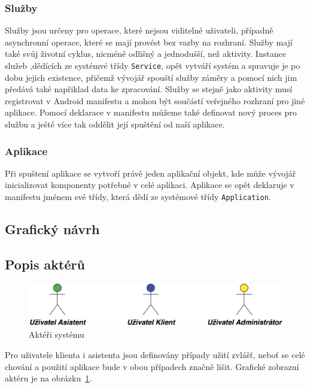 \documentclass{article}
\begin{document}
\subsubsection{Služby}
Služby jsou určeny pro operace, které nejsou viditelné uživateli, případně asynchronní operace, které se mají
provést bez vazby na rozhraní. Služby mají také svůj životní cyklus, nicméně odlišný a jednodušší,
než aktivity. Instance služeb ,dědících ze systémvé třídy \texttt{Service}, opět vytváří
systém a spravuje je po dobu jejich existence,
přičemž vývojář spouští služby záměry a pomocí nich jim předává také napřiklad data ke zpracování.
Služby se stejně jako aktivity musí registrovat v Android manifestu a mohou být součástí veřejného
rozhraní pro jiné aplikace. Pomocí deklarace v manifestu můžeme také definovat nový proces pro službu
a ještě více tak oddělit její spuštění od naší aplikace.

\subsubsection{Aplikace}
Při spuštení aplikace se vytvoří právě jeden aplikační objekt, kde může vývojář inicializovat
komponenty potřebné v celé aplikaci. Aplikace se opět deklaruje v manifestu jménem své třídy, která
dědí ze systémové třídy \texttt{Application}.

\subsection{Grafický návrh}

\subsection{Popis aktérů}
\begin{figure}[H]
        \centering
                \includegraphics[scale=0.14]{img/actors.png}
        \caption{Aktéři systému}
        \label{fig:actors}
\end{figure}

Pro uživatele klienta i asistenta jsou definovány případy užití zvlášť, neboť se celé chování
a použití aplikace bude v obou případech značně lišit. Grafické zobrazní aktéru je na obrázku~\ref{fig:actors}.
\end{document}

